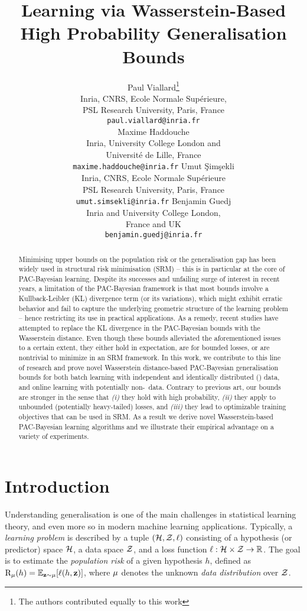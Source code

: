 \documentclass{article}
\title{Learning via Wasserstein-Based High Probability Generalisation Bounds}
\author{%
  Paul Viallard\thanks{The authors contributed equally to this work} \\
  Inria, CNRS, Ecole Normale Supérieure,\\
  PSL Research University, Paris, France\\
  \texttt{paul.viallard@inria.fr} \\
  \And
  Maxime Haddouche\footnotemark[1]\\
  Inria, University College London
  and \\ Université de Lille, France \\
  \texttt{maxime.haddouche@inria.fr}
  \AND
  Umut Şimşekli\\
  Inria, CNRS, Ecole Normale Supérieure\\
PSL Research University, Paris, France\\
  \texttt{umut.simsekli@inria.fr}
  \And
  Benjamin Guedj\\
  Inria and University College London,\\
  France and UK\\
  \texttt{benjamin.guedj@inria.fr}
}
\begin{document}
\maketitle

\begin{abstract}
Minimising upper bounds on the population risk or the generalisation gap has been widely used in structural risk minimisation (SRM) -- this is in particular at the core of PAC-Bayesian learning.
Despite its successes and unfailing surge of interest in recent years, a limitation of the PAC-Bayesian framework is that most bounds involve a Kullback-Leibler (KL) divergence term (or its variations), which might exhibit erratic behavior and fail to capture the underlying geometric structure of the learning problem -- hence restricting its use in practical applications.
As a remedy, recent studies have attempted to replace the KL divergence in the PAC-Bayesian bounds with the Wasserstein distance.
Even though these bounds alleviated the aforementioned issues to a certain extent, they either hold in expectation, are for bounded losses, or are nontrivial to minimize in an SRM framework. 
In this work, we contribute to this line of research and prove novel Wasserstein distance-based PAC-Bayesian generalisation bounds for both batch learning with independent and identically distributed (\iid) data, and online learning with potentially non-\iid\ data.
Contrary to previous art, our bounds are stronger in the sense that {\it (i)} they hold with high probability, {\it (ii)} they apply to unbounded (potentially heavy-tailed) losses, and {\it (iii)} they lead to optimizable training objectives that can be used in SRM.
As a result we derive novel Wasserstein-based PAC-Bayesian learning algorithms and we illustrate their empirical advantage on a variety of experiments.
\end{abstract}

\section{Introduction}

Understanding generalisation is one of the main challenges in statistical learning theory, and even more so in modern machine learning applications.
Typically, a \emph{learning problem} is described by a tuple $(\mathcal{H}, \mathcal{Z}, \ell)$ consisting of a hypothesis (or predictor) space $\mathcal{H}$, a data space $\mathcal{Z}$, and a loss function $\ell : \mathcal{H}\times \mathcal{Z} \rightarrow \mathbb{R}$.
The goal is to estimate the \emph{population risk} of a given hypothesis $h$, defined as $\text{R}_{\mu}(h) = \operatorname*{\mathbb{E}}_{\mathbf{z}\sim\mu}[\ell(h , \mathbf{z})]$, where $\mu$ denotes the unknown \emph{data distribution} over $\mathcal{Z}$. 
\end{document}
